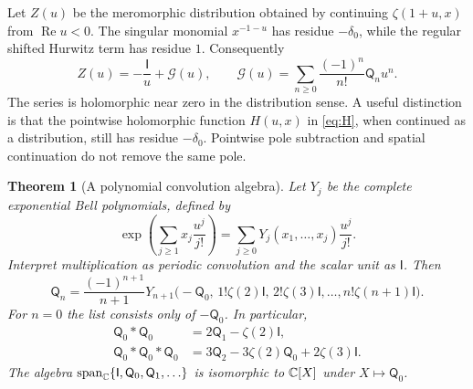 \documentclass[11pt]{article}
\numberwithin{equation}{section}
\newtheorem{theorem}{Theorem}[section]
\theoremstyle{definition}\newtheorem{definition}[theorem]{Definition}
\theoremstyle{remark}\newtheorem{remark}[theorem]{Remark}
\DeclareMathOperator{\Rea}{Re}
\newcommand{\qn}[1]{\mathsf Q_{#1}}
\newcommand{\id}{\mathsf I}
\newcommand{\calG}{\mathcal G}
\begin{document}
Let $Z(u)$ be the meromorphic distribution obtained by continuing
$\zeta(1+u,x)$ from $\Rea u<0$. The singular monomial $x^{-1-u}$
has residue $-\delta_0$, while the regular shifted Hurwitz term has
residue $1$. Consequently
\begin{equation}\label{eq:Zdistribution}
 Z(u)=-\frac{\id}{u}+\calG(u),\qquad
 \calG(u)=\sum_{n\ge0}\frac{(-1)^n}{n!}\qn n u^n.
\end{equation}
The series is holomorphic near zero in the distribution sense. A useful
distinction is that the pointwise holomorphic function $H(u,x)$ in
\eqref{eq:H}, when continued as a distribution, still has residue
$-\delta_0$. Pointwise pole subtraction and spatial continuation do not
remove the same pole.

\begin{theorem}[A polynomial convolution algebra]\label{thm:algebra}
Let $Y_j$ be the complete exponential Bell polynomials, defined by
\[
 \exp\left(\sum_{j\ge1}x_j\frac{u^j}{j!}\right)
 =\sum_{j\ge0}Y_j(x_1,\ldots,x_j)\frac{u^j}{j!}.
\]
Interpret multiplication as periodic convolution and the scalar unit as
$\id$. Then
\begin{equation}\label{eq:Bell}
 \qn n=\frac{(-1)^{n+1}}{n+1}
 Y_{n+1}\bigl(-\qn0,\,1!\zeta(2)\id,\,2!\zeta(3)\id,
                  \ldots,n!\zeta(n+1)\id\bigr).
\end{equation}
For $n=0$ the list consists only of $-\qn0$. In particular,
\begin{align}
 \qn0*\qn0&=2\qn1-\zeta(2)\id,\label{eq:Qsquare}\\
 \qn0*\qn0*\qn0&=3\qn2-3\zeta(2)\qn0+2\zeta(3)\id.
 \label{eq:Qcube}
\end{align}
The algebra $\operatorname{span}_{\C}\{\id,\qn0,\qn1,\ldots\}$ is
isomorphic to $\mathbb C[X]$ under $X\mapsto\qn0$.
\end{theorem}
\end{document}
